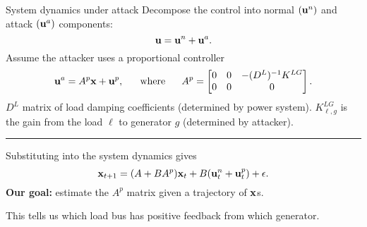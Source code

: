 \begin{frame}{System dynamics under attack}
Decompose the control into normal $(\mathbf{u}^n)$ and attack $(\mathbf{u}^a)$ components:
\begin{equation}
\mathbf{u} = \mathbf{u}^n + \mathbf{u}^a.
\end{equation}
Assume the attacker uses a proportional controller
\begin{equation}
\mathbf{u}^a = A^p\mathbf{x} + \mathbf{u}^p,
\text{~~~~~where~~~~~}
A^p =
\begin{bmatrix}
0 & 0 & -(D^L)^{-1}K^{LG}
\\
0 & 0 & 0
\end{bmatrix}
.
\end{equation}
$D^L$ matrix of load damping coefficients (determined by power system).
$K^{LG}_{\ell,g}$ is the gain from the load $\ell$ to generator $g$ (determined by attacker).

\noindent\rule[0.5ex]{\linewidth}{1pt}
\pause

Substituting into the system dynamics gives
\begin{equation}
\mathbf{x}_{t+1} = (A+BA^p)\mathbf{x}_t + B(\mathbf{u}_t^n+\mathbf{u}_t^p) + \epsilon.
\end{equation}
\textbf{Our goal:} estimate the $A^p$ matrix given a trajectory of $\mathbf{x}$s.

This tells us which load bus has positive feedback from which generator.

\end{frame}

